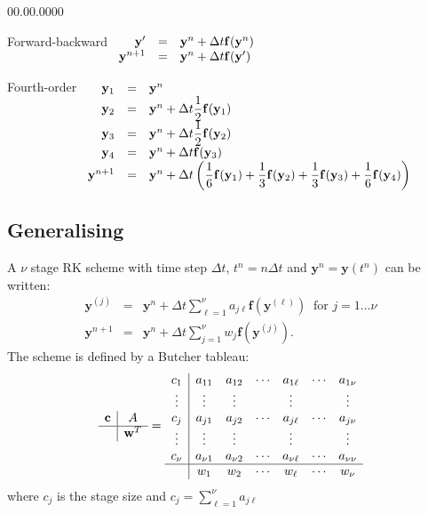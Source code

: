 \begin{lyxlist}{00.00.0000}
\item [{Forward-backward}] $\begin{array}[t]{rcl}
\mathbf{y}^{\prime} & = & \mathbf{y}^{n}+\Delta t\mathbf{f}(\mathbf{y}^{n})\\
\mathbf{y}^{n+1} & = & \mathbf{y}^{n}+\Delta t\mathbf{f}(\mathbf{y}^{\prime})
\end{array}$
\item [{Fourth-order}] $\begin{array}[t]{rcl}
\mathbf{y}_{1} & = & \mathbf{y}^{n}\\
\mathbf{y}_{2} & = & \mathbf{y}^{n}+\Delta t\dfrac{1}{2}\mathbf{f}(\mathbf{y}_{1})\\
\mathbf{y}_{3} & = & \mathbf{y}^{n}+\Delta t\dfrac{1}{2}\mathbf{f}(\mathbf{y}_{2})\\
\mathbf{y}_{4} & = & \mathbf{y}^{n}+\Delta t\mathbf{f}(\mathbf{y}_{3})\\
\mathbf{y}^{n+1} & = & \mathbf{y}^{n}+\Delta t\left(\dfrac{1}{6}\mathbf{f}(\mathbf{y}_{1})+\dfrac{1}{3}\mathbf{f}(\mathbf{y}_{2})+\dfrac{1}{3}\mathbf{f}(\mathbf{y}_{3})+\dfrac{1}{6}\mathbf{f}(\mathbf{y}_{4})\right)
\end{array}$
\end{lyxlist}

\subsection*{\clearpage{}Generalising}

A $\nu$ stage RK scheme with time step $\Delta t$, $t^{n}=n\Delta t$
and $\mathbf{y}^{n}=\mathbf{y}(t^{n})$ can be written:
\begin{eqnarray*}
\mathbf{y}^{(j)} & = & \mathbf{y}^{n}+\Delta t\sum_{\ell=1}^{\nu}a_{j\ell}\mathbf{f}\left(\mathbf{y}^{(\ell)}\right)\ \text{ for }j=1\ldots\nu\\
\mathbf{y}^{n+1} & = & \mathbf{y}^{n}+\Delta t\sum_{j=1}^{\nu}w_{j}\mathbf{f}\left(\mathbf{y}^{(j)}\right).
\end{eqnarray*}
The scheme is defined by a Butcher tableau:
\[
\begin{array}{c|c}
\mathsf{\mathbf{c}} & A\\
\hline  & \mathbf{w}^{T}
\end{array}=\begin{array}{c|cccccc}
c_{1} & a_{11} & a_{12} & \cdots & a_{1\ell} & \cdots & a_{1\nu}\\
\vdots & \vdots & \vdots &  & \vdots &  & \vdots\\
c_{j} & a_{j1} & a_{j2} & \cdots & a_{j\ell} & \cdots & a_{j\nu}\\
\vdots & \vdots & \vdots &  & \vdots &  & \vdots\\
c_{\nu} & a_{\nu1} & a_{\nu2} & \cdots & a_{\nu\ell} & \cdots & a_{\nu\nu}\\
\hline  & w_{1} & w_{2} & \cdots & w_{\ell} & \cdots & w_{\nu}
\end{array}
\]
where $c_{j}$ is the stage size and $c_{j}={\displaystyle \sum_{\ell=1}^{\nu}}a_{j\ell}$

